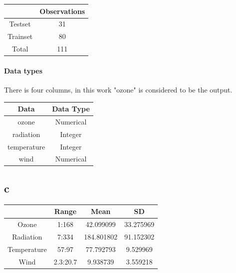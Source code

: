 \documentclass[11pt,a4paper,twoside,openright]{report}
\begin{document}
	
	\begin{table}[H]
		\centering
		\begin{tabular}{|c|c|}
			\hline 
			& \textbf{Observations} \\ 
			\hline 
			Testset & 31 \\ 
			\hline 
			Trainset & 80 \\ 
			\hline 
			Total & 111 \\ 
			\hline 
		\end{tabular} 
	\end{table}


\paragraph{Data types}  There is four columns, in this work "ozone" is considered to be the output.\\

	\begin{table}[H]
		\centering
		\begin{tabular}{|c|c|}
			\hline 
			\textbf{Data} & \textbf{Data Type}\\ 
			\hline 
			ozone & Numerical \\ 
			\hline 
			radiation & Integer \\ 
			\hline 
			temperature & Integer \\ 
			\hline 
			wind & Numerical \\ 
			\hline 
		\end{tabular} 
	\end{table}
	
	
	\subsection*{c}
	
	 
	\begin{table}[H]
		\centering
		\begin{tabular}{|c|c|c|c|}
			\hline 
			& Range & Mean & SD \\ 
			\hline 
			Ozone & 1:168 & 42.099099 & 33.275969 \\ 
			\hline 
			Radiation & 7:334 & 184.801802 & 91.152302 \\ 
			\hline 
			Temperature & 57:97 & 77.792793 & 9.529969 \\ 
			\hline 
			Wind & 2.3:20.7 & 9.938739 & 3.559218 \\ 
			\hline 
		\end{tabular} 
	\end{table}
	
\end{document}
